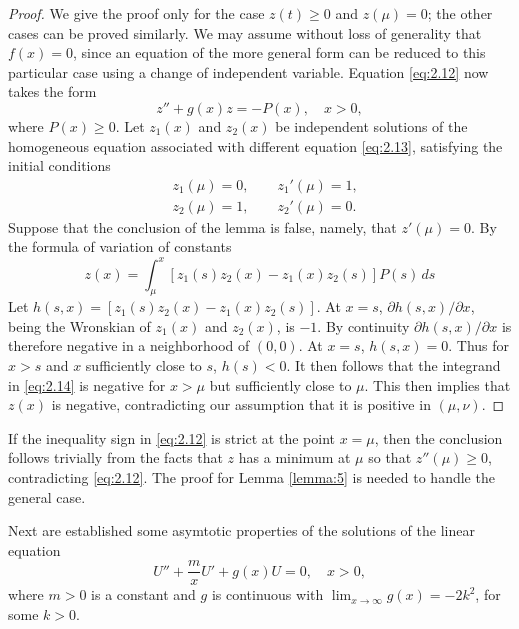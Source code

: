 \begin{proof}
  We give the proof only for the case $z(t)\geq 0$ and $z(\mu) = 0$;
  the other cases can be proved similarly. We may assume without loss of
  generality that $f(x)=0$, since an equation of the more general form
  can be reduced to this particular case using a change of independent variable.
  Equation \eqref{eq:2.12} now takes the form
  \begin{equation}\label{eq:2.13}
    z'' + g(x)z = -P(x),\quad x>0,
  \end{equation}
  where $P(x) \geq 0$. Let $z_1(x)$ and $z_2(x)$ be independent solutions of the
  homogeneous equation associated with different equation \eqref{eq:2.13},
  satisfying the initial conditions
  \begin{align*}
    & z_1(\mu) = 0,\qquad z_1'(\mu) = 1, \\
    & z_2(\mu) = 1,\qquad z_2'(\mu) = 0.
  \end{align*}
  Suppose that the conclusion of the lemma is false, namely,
  that $z'(\mu)=0$. By the formula of variation of constants
  \begin{equation}\label{eq:2.14}
    z(x) = \int_\mu^x [z_1(s)z_2(x) - z_1(x)z_2(s)] P(s)\,ds
  \end{equation}
  Let $h(s,x) = [z_1(s)z_2(x) - z_1(x)z_2(s)]$. At $x=s$,
  $\partial h(s,x)/\partial x$, being the Wronskian of $z_1(x)$
  and $z_2(x)$, is $-1$. By continuity $\partial h(s,x)/\partial x$
  is therefore negative in a neighborhood of $(0,0)$.
  At $x=s$, $h(s,x)=0$. Thus for $x>s$ and $x$ sufficiently close to $s$,
  $h(s)<0$. It then follows that the integrand in \eqref{eq:2.14}
  is negative for $x>\mu$ but sufficiently close to $\mu$.
  This then implies that $z(x)$ is negative, contradicting our assumption
  that it is positive in $(\mu,\nu)$.
\end{proof}

If the inequality sign in \eqref{eq:2.12} is strict at the point $x=\mu$,
then the conclusion follows trivially from the facts that $z$ has a minimum
at $\mu$ so that $z''(\mu)\geq 0$, contradicting \eqref{eq:2.12}.
The proof for Lemma \ref{lemma:5} is needed to handle the general case.

Next are established some asymtotic properties of the solutions of the linear
equation
\begin{equation}\label{eq:2.15}
  U'' + \frac{m}{x}U' + g(x)U = 0,\quad x>0,
\end{equation}
where $m>0$ is a constant and $g$ is continuous with $\lim_{x\to\infty} g(x) = -2k^2$,
for some $k>0$.


